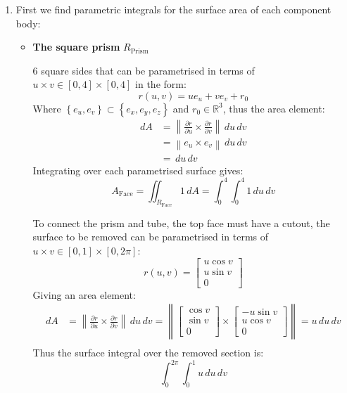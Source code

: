 \documentclass[a4paper, 11pt]{article}
\newcommand{\RR}{\mathbb{R}}
\def\set#1{\left\{ #1 \right\}}
\def\pp#1#2{\frac{\partial #1}{\partial #2}}
\begin{document}
\begin{enumerate}[label=(\alph*)]
	\item First we find parametric integrals for the surface area of each component body:
	      \begin{itemize}
		      \item \textbf{The square prism} $R_\text{Prism}$
		            \begin{mdframed}
			            6 square sides that can be parametrised in terms of $u\times v \in[0,4]\times [0,4]$ in the form:
			            $$
				            r(u,v)=ue_u+ve_v +r_0
			            $$
			            Where $\set{e_u,e_v}\subset\set{e_x,e_y,e_z}$ and $r_0\in\RR^3$, thus the area element:
			            \begin{align*}
				            dA & =\left\|\pp ru \times \pp rv\right\|\,du\,dv \\
				               & =\left\|e_u\times e_v \right\|      \,du\,dv \\
				               & =\,du\,dv
			            \end{align*}
			            Integrating over each parametrised surface gives:
			            $$A_\text{Face}=\iint_{R_\text{Face}}1\,dA =  \int_0^4\int_0^4 1\,du\,dv$$

			            To connect the prism and tube, the top face must have a cutout, the surface to be removed can be parametrised in terms of $u\times v\in[0,1]\times [0,2\pi]$:
			            $$r(u,v)=\begin{bmatrix}
					            u\cos v \\u\sin v\\0
				            \end{bmatrix}
			            $$
			            Giving an area element:
			            \begin{align*}
				            dA & = \left\|\pp ru \times \pp rv\right\|\,du\,dv
				            = \left\|
				            \begin{bmatrix}
					            \cos v \\
					            \sin v \\
					            0
				            \end{bmatrix}
				            \times
				            \begin{bmatrix}
					            -u\sin v \\
					            u\cos v  \\
					            0
				            \end{bmatrix}
				            \right\|
				            =
				            u \,du \,dv                                        \\
			            \end{align*}
			            Thus the surface integral over the removed section is:
			            \[
				            \int_0^{2\pi} \int_0^1u\,du\,dv
			            \]


\end{mdframed}
\end{itemize}
\end{enumerate}
\end{document}
